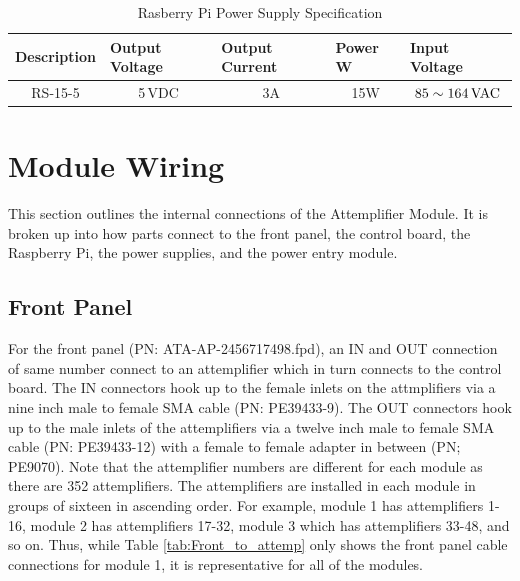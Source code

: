 \documentclass[12pt,a4paper,oneside]{article}
\begin{document}
\begin{table}[H]
\centering
\caption{Rasberry Pi Power Supply Specification}
\label{tab:ras_psu_spec}
\begin{tabular}{@{}ccccc@{}}
\toprule
\multicolumn{1}{l}{Description} & \multicolumn{1}{l}{Output Voltage} & \multicolumn{1}{l}{Output Current} & \multicolumn{1}{l}{Power W} & \multicolumn{1}{l}{Input Voltage} \\ \midrule
RS-15-5                        & 5\,VDC                               & 3A                               & 15W                         & $85 \sim 164\,\rm{VAC}$                              \\ \bottomrule
\end{tabular}
\end{table}




\section{Module Wiring}
\label{sec:6}

This section outlines the internal connections of the Attemplifier Module. It is broken up into how parts connect to the front panel, the control board, the Raspberry Pi, the power supplies, and the power entry module. 

\subsection{Front Panel}      
\label{sec:6.1}

 For the front panel (PN: ATA-AP-2456717498.fpd), an IN and OUT connection of same number connect to an attemplifier which in turn connects to the control board. The IN connectors hook up to the female inlets on the attmplifiers via a nine inch male to female SMA cable (PN: PE39433-9). The OUT connectors hook up to the male inlets of the attemplifiers via a twelve inch male to female SMA cable (PN: PE39433-12) with a female to female adapter in between (PN; PE9070). Note that the attemplifier numbers are different for each module as there are 352 attemplifiers. The attemplifiers are installed in each module in groups of sixteen in ascending order. For example, module 1 has attemplifiers 1-16, module 2 has attemplifiers 17-32, module 3 which has attemplifiers 33-48, and so on. Thus, while Table \ref{tab:Front_to_attemp} only shows the front panel cable connections for module 1, it is representative for all of the modules.
\end{document}
